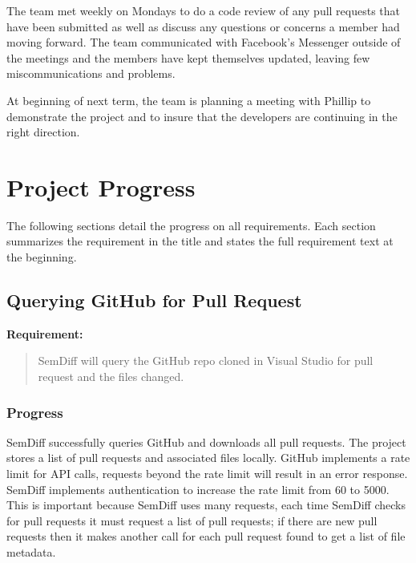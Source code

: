 \documentclass[draftclsnofoot,onecolumn]{IEEEtran}
\begin{document}
The team met weekly on Mondays to do a code review of any pull requests that 
have been submitted as well as discuss any questions or concerns a member had 
moving forward. The team communicated with Facebook's Messenger outside of the 
meetings and the members have kept themselves updated, leaving few 
miscommunications and problems.

At beginning of next term, the team is planning a meeting with Phillip to 
demonstrate the project and to insure that the developers are continuing in the 
right direction.

\section{Project Progress}%

The following sections detail the progress on all requirements. Each section 
summarizes the requirement in the title and states the full requirement text at 
the beginning.

\subsection{Querying GitHub for Pull Request}%

\textbf{Requirement:}

\begin{quote}

SemDiff will query the GitHub repo cloned in Visual Studio for pull request 
and the files changed.

\end{quote}

\subsubsection{Progress}

SemDiff successfully queries GitHub and downloads all pull requests. The 
project stores a list of pull requests and associated files locally. GitHub 
implements a rate limit for API calls, requests beyond the rate limit will 
result in an error response. SemDiff implements authentication to increase the 
rate limit from 60 to 5000. This is important because SemDiff uses many 
requests, each time SemDiff checks for pull requests it must request a list 
of pull requests; if there are new pull requests then it makes another call 
for each pull request found to get a list of file metadata.
\end{document}
